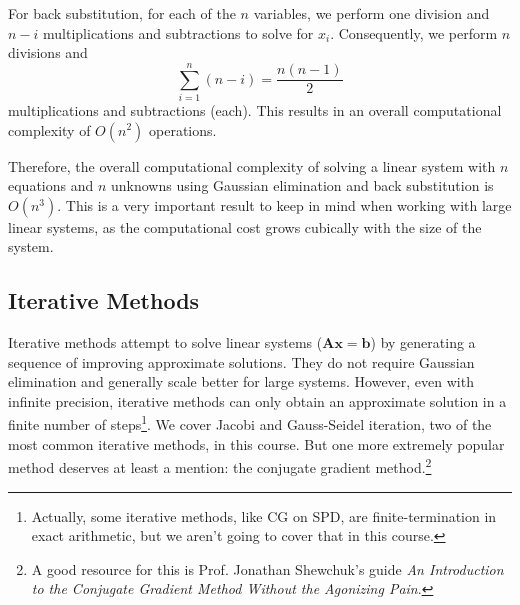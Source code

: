 For back substitution, for each of the $n$ variables, we perform one division and $n - i$ multiplications and subtractions to solve for $x_i$. Consequently, we perform $n$ divisions and
\begin{equation*}
    \sum_{i=1}^{n} (n - i) = \frac{n(n - 1)}{2}
\end{equation*}
multiplications and subtractions (each). This results in an overall computational complexity of $ O(n^2) $ operations.

Therefore, the overall computational complexity of solving a linear system with $n$ equations and $n$ unknowns using Gaussian elimination and back substitution is $ O(n^3) $. This is a very important result to keep in mind when working with large linear systems, as the computational cost grows cubically with the size of the system.

\subsection{Iterative Methods}
Iterative methods attempt to solve linear systems ($\mathbf{A}\mathbf{x} = \mathbf{b}$) by generating a sequence of improving approximate solutions. They do not require Gaussian elimination and generally scale better for large systems. However, even with infinite precision, iterative methods can only obtain an approximate solution in a finite number of steps\footnote{Actually, some iterative methods, like CG on SPD, are finite-termination in exact arithmetic, but we aren't going to cover that in this course.}. We cover Jacobi and Gauss-Seidel iteration, two of the most common iterative methods, in this course. But one more extremely popular method deserves at least a mention: the conjugate gradient method.\footnote{A good resource for this is Prof. Jonathan Shewchuk's guide \textit{An Introduction to the Conjugate Gradient Method Without the Agonizing Pain}.\autocite{shewchuk1994}}

